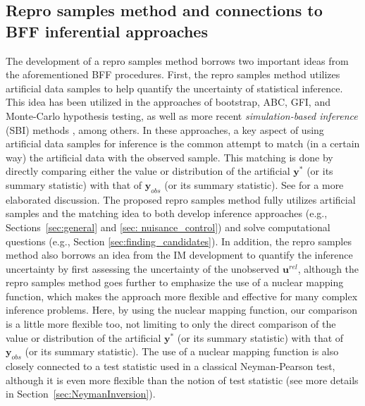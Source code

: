 \documentclass[12pt]{article}
\theoremstyle{shortspace}
\def\*#1{\bm{#1}}
\begin{document}
\subsection{Repro samples method and connections to BFF inferential approaches}\label{sec:comp_smry}

\quad The development of a repro samples method borrows two important ideas from the aforementioned BFF procedures. First, the repro samples method utilizes artificial data samples to help quantify the uncertainty of statistical inference. This idea has been utilized in the approaches of bootstrap, ABC, GFI, and Monte-Carlo hypothesis testing, as well as more recent {\it simulation-based inference} (SBI) methods \citep{dalmasso2022,tomaselli2025robustsimulationbasedinference}, among others.  In these approaches, a key aspect of using artificial data samples for inference 
is the common attempt 
to match (in a certain way) the artificial data with the observed sample. This matching is done by directly comparing either the value or distribution of the artificial $\*y^*$ (or its summary statistic) with that of $\*y_{obs}$ (or its summary statistic). See \cite{Thornton2022} for a more elaborated discussion. The proposed repro samples method fully utilizes artificial samples and the matching idea to both develop inference approaches (e.g., Sections~\ref{sec:general} and \ref{sec: nuisance_control}) and solve computational questions (e.g., Section \ref{sec:finding_candidates}).
In addition, the repro samples method also borrows an idea from the IM development to quantify the inference uncertainty by first assessing the uncertainty of the unobserved $\*u^{rel}$, although the repro samples method goes further to emphasize the use of a nuclear mapping function, which makes the approach more flexible and effective for many complex inference problems. 
Here, by using the nuclear mapping function, our comparison is a little more flexible too, not limiting to only the direct comparison of the value or distribution of the artificial $\*y^*$ (or its summary statistic) with that of $\*y_{obs}$ (or its summary statistic).
The use of a nuclear mapping function is also closely connected to a test statistic used in a classical Neyman-Pearson test, although it is even more flexible than the notion of test statistic (see more details in Section~\ref{sec:NeymanInversion}).  
\end{document}
